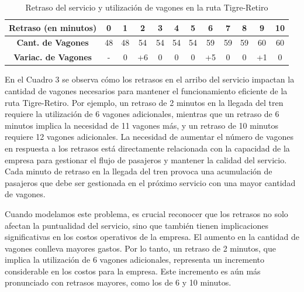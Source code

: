 \documentclass{article}
\begin{document}
    \begin{table}[htbp]
            \centering
            \caption{Retraso del servicio y utilización de vagones en la ruta Tigre-Retiro}
            \begin{tabular}{|c||c|c|c|c|c|c|c|c|c|c|c|}
                \hline
                \textbf{Retraso (en minutos)} & \textbf{0} & \textbf{1} & \textbf{2} & \textbf{3} & \textbf{4} & \textbf{5} & \textbf{6} & \textbf{7} & \textbf{8} & \textbf{9} & \textbf{10} \\
                \hline
                \textbf{Cant. de Vagones}   & 48           & 48    & 54       & 54           & 54           & 54           & 59           & 59           & 59           & 60           & 60                  \\
                \hline
                \textbf{Variac. de Vagones} & - & 0 & +6 & 0 & 0 & 0 & +5 & 0 & 0 & +1 & 0\\
                \hline
            \end{tabular}
        \end{table}
       En el Cuadro 3 se observa cómo los retrasos en el arribo del servicio impactan la cantidad de vagones necesarios para mantener el funcionamiento eficiente de la ruta Tigre-Retiro. Por ejemplo, un retraso de 2 minutos en la llegada del tren requiere la utilización de 6 vagones adicionales, mientras que un retraso de 6 minutos implica la necesidad de 11 vagones más, y un retraso de 10 minutos requiere 12 vagones adicionales. 
       La necesidad de aumentar el número de vagones en respuesta a los retrasos está directamente relacionada con la capacidad de la empresa para gestionar el flujo de pasajeros y mantener la calidad del servicio. Cada minuto de retraso en la llegada del tren provoca una acumulación de pasajeros que debe ser gestionada en el próximo servicio con una mayor cantidad de vagones. 
       
       Cuando modelamos este problema, es crucial reconocer que los retrasos no solo afectan la puntualidad del servicio, sino que también tienen implicaciones significativas en los costos operativos de la empresa. El aumento en la cantidad de vagones conlleva mayores gastos. Por lo tanto, un retraso de 2 minutos, que implica la utilización de 6 vagones adicionales, representa un incremento considerable en los costos para la empresa. Este incremento es aún más pronunciado con retrasos mayores, como los de 6 y 10 minutos.
       
\end{document}
